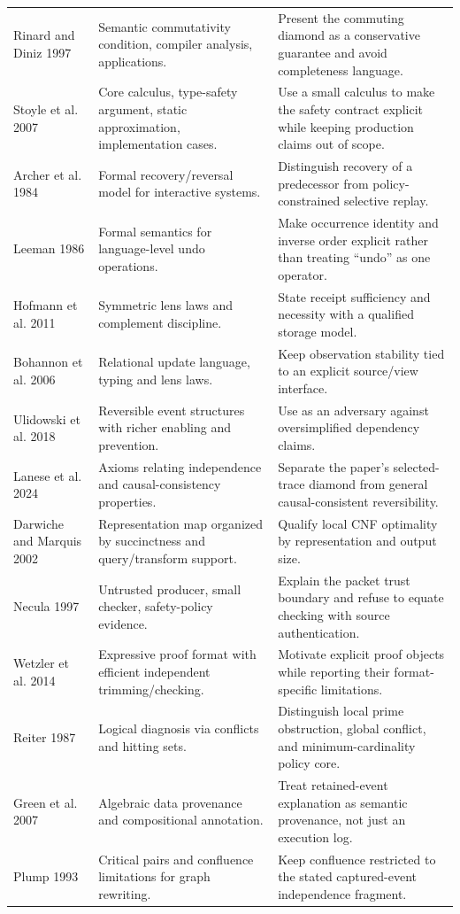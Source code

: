 \begin{longtable}{@{}p{}p{}p{}@{}}
Rinard and Diniz 1997 \cite{Rinard1997} & Semantic commutativity condition, compiler analysis, applications. & Present the commuting diamond as a conservative guarantee and avoid completeness language. \\
Stoyle et al. 2007 \cite{Stoyle2007} & Core calculus, type-safety argument, static approximation, implementation cases. & Use a small calculus to make the safety contract explicit while keeping production claims out of scope. \\
Archer et al. 1984 \cite{Archer1984} & Formal recovery/reversal model for interactive systems. & Distinguish recovery of a predecessor from policy-constrained selective replay. \\
Leeman 1986 \cite{Leeman1986} & Formal semantics for language-level undo operations. & Make occurrence identity and inverse order explicit rather than treating ``undo'' as one operator. \\
Hofmann et al. 2011 \cite{Hofmann2011} & Symmetric lens laws and complement discipline. & State receipt sufficiency and necessity with a qualified storage model. \\
Bohannon et al. 2006 \cite{Bohannon2006} & Relational update language, typing and lens laws. & Keep observation stability tied to an explicit source/view interface. \\
Ulidowski et al. 2018 \cite{Ulidowski2018} & Reversible event structures with richer enabling and prevention. & Use as an adversary against oversimplified dependency claims. \\
Lanese et al. 2024 \cite{Lanese2024} & Axioms relating independence and causal-consistency properties. & Separate the paper's selected-trace diamond from general causal-consistent reversibility. \\
Darwiche and Marquis 2002 \cite{DarwicheMarquis2002} & Representation map organized by succinctness and query/transform support. & Qualify local CNF optimality by representation and output size. \\
Necula 1997 \cite{Necula1997} & Untrusted producer, small checker, safety-policy evidence. & Explain the packet trust boundary and refuse to equate checking with source authentication. \\
Wetzler et al. 2014 \cite{Wetzler2014} & Expressive proof format with efficient independent trimming/checking. & Motivate explicit proof objects while reporting their format-specific limitations. \\
Reiter 1987 \cite{Reiter1987} & Logical diagnosis via conflicts and hitting sets. & Distinguish local prime obstruction, global conflict, and minimum-cardinality policy core. \\
Green et al. 2007 \cite{Green2007} & Algebraic data provenance and compositional annotation. & Treat retained-event explanation as semantic provenance, not just an execution log. \\
Plump 1993 \cite{Plump1993} & Critical pairs and confluence limitations for graph rewriting. & Keep confluence restricted to the stated captured-event independence fragment. \\
\bottomrule
\end{longtable}

